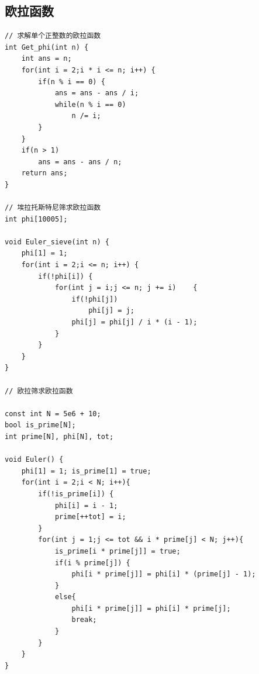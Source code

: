 \documentclass[twoside]{article}
\begin{document}
\subsection{欧拉函数}
\begin{lstlisting}
// 求解单个正整数的欧拉函数
int Get_phi(int n) {
    int ans = n;
    for(int i = 2;i * i <= n; i++) {
        if(n % i == 0) {
            ans = ans - ans / i;
            while(n % i == 0)
                n /= i;
        }
    }
    if(n > 1)
        ans = ans - ans / n;
    return ans;
}

// 埃拉托斯特尼筛求欧拉函数
int phi[10005];

void Euler_sieve(int n) {
    phi[1] = 1;
    for(int i = 2;i <= n; i++) {
        if(!phi[i]) {
            for(int j = i;j <= n; j += i)    {
                if(!phi[j])
                    phi[j] = j;
                phi[j] = phi[j] / i * (i - 1); 
            }
        }
    }
}

// 欧拉筛求欧拉函数

const int N = 5e6 + 10;
bool is_prime[N];
int prime[N], phi[N], tot;

void Euler() {
    phi[1] = 1; is_prime[1] = true;
    for(int i = 2;i < N; i++){
        if(!is_prime[i]) {
            phi[i] = i - 1;
            prime[++tot] = i;
        }
        for(int j = 1;j <= tot && i * prime[j] < N; j++){
            is_prime[i * prime[j]] = true;
            if(i % prime[j]) {
                phi[i * prime[j]] = phi[i] * (prime[j] - 1);
            }
            else{
                phi[i * prime[j]] = phi[i] * prime[j];
                break;
            }
        }
    }
}\end{lstlisting}
\end{document}
